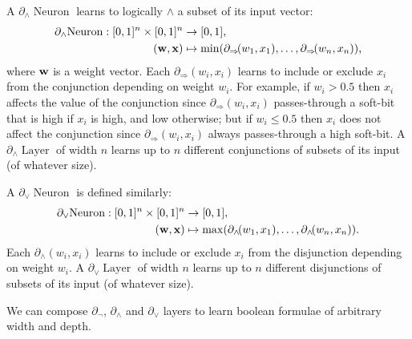 \documentclass{article} %
\begin{document}
A $\partial_{\wedge}\!\operatorname{Neuron}$ learns to logically $\wedge$ a subset of its input vector:
\begin{equation*}
\begin{aligned}
\partial_{\wedge}\!\operatorname{Neuron}: [0,1]^{n} \times [0,1]^{n} &\to [0,1], \\
({\bf w}, {\bf x}) &\mapsto \min(\partial_{\Rightarrow}\!(w_{1}, x_{1}), \dots, \partial_{\Rightarrow}\!(w_{n}, x_{n}))\text{,}
\end{aligned}
\end{equation*}
where ${\bf w}$ is a weight vector. Each $\partial_{\Rightarrow}(w_{i},x_{i})$ learns to include or exclude $x_{i}$ from the conjunction depending on weight $w_{i}$. For example, if $w_{i}>0.5$ then $x_{i}$ affects the value of the conjunction since $\partial_{\Rightarrow}(w_{i},x_{i})$ passes-through a soft-bit that is high if $x_{i}$ is high, and low otherwise; but if $w_{i} \leq 0.5$ then $x_{i}$ does not affect the conjunction since $\partial_{\Rightarrow}(w_{i},x_{i})$ always passes-through a high soft-bit. A $\partial_{\wedge}\!\operatorname{Layer}$ of width $n$ learns up to $n$ different conjunctions of subsets of its input (of whatever size).

A $\partial_{\vee}\!\operatorname{Neuron}$ is defined similarly:
\begin{equation*}
\begin{aligned}
\partial_{\vee}\!\operatorname{Neuron}: [0,1]^{n} \times [0,1]^{n} &\to [0,1], \\
({\bf w}, {\bf x}) &\mapsto \max(\partial_{\wedge}\!(w_{1}, x_{1}), \dots, \partial_{\wedge}\!(w_{n}, x_{n}))\text{.}
\end{aligned}
\end{equation*}
Each $\partial_{\wedge}(w_{i},x_{i})$ learns to include or exclude $x_{i}$ from the disjunction depending on weight $w_{i}$. A $\partial_{\vee}\!\operatorname{Layer}$ of width $n$ learns up to $n$ different disjunctions of subsets of its input (of whatever size).

We can compose $\partial_{\neg}$, $\partial_{\wedge}$ and $\partial_{\vee}$ layers to learn boolean formulae of arbitrary width and depth.
\end{document}
